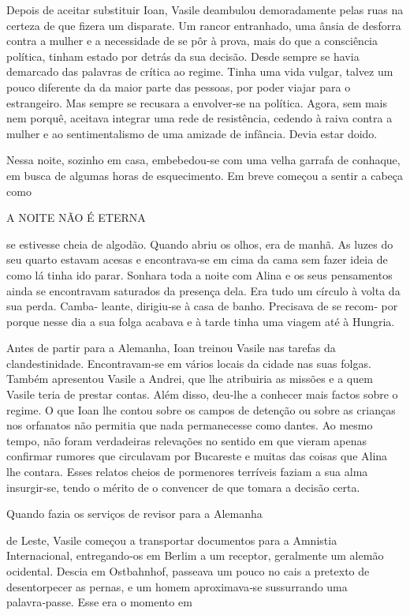 Depois de aceitar substituir Ioan, Vasile deambulou demoradamente pelas
ruas na certeza de que fizera um disparate. Um rancor entranhado, uma
ânsia de desforra contra a mulher e a necessidade de se pôr à prova,
mais do que a consciência política, tinham estado por detrás da sua
decisão. Desde sempre se havia demarcado das palavras de crítica ao
regime. Tinha uma vida vulgar, talvez um pouco diferente da da maior
parte das pessoas, por poder viajar para o estrangeiro. Mas sempre se
recusara a envolver‑se na política. Agora, sem mais nem porquê, aceitava
integrar uma rede de resistência, cedendo à raiva contra a mulher e ao
sentimentalismo de uma amizade de infância. Devia estar doido.

Nessa noite, sozinho em casa, embebedou‑se com uma velha garrafa de
conhaque, em busca de algumas horas de esquecimento. Em breve começou a
sentir a cabeça como

A NOITE NÃO É ETERNA

se estivesse cheia de algodão. Quando abriu os olhos, era de manhã. As
luzes do seu quarto estavam acesas e encontrava‑se em cima da cama sem
fazer ideia de como lá tinha ido parar. Sonhara toda a noite com Alina e
os seus pensamentos ainda se encontravam saturados da presença dela. Era
tudo um círculo à volta da sua perda. Camba‑ leante, dirigiu‑se à casa
de banho. Precisava de se recom‑ por porque nesse dia a sua folga
acabava e à tarde tinha uma viagem até à Hungria.

Antes de partir para a Alemanha, Ioan treinou Vasile nas tarefas da
clandestinidade. Encontravam‑se em vários locais da cidade nas suas
folgas. Também apresentou Vasile a Andrei, que lhe atribuiria as missões
e a quem Vasile teria de prestar contas. Além disso, deu‑lhe a conhecer
mais factos sobre o regime. O que Ioan lhe contou sobre os campos de
detenção ou sobre as crianças nos orfanatos não permitia que nada
permanecesse como dantes. Ao mesmo tempo, não foram verdadeiras
relevações no sentido em que vieram apenas confirmar rumores que
circulavam por Bucareste e muitas das coisas que Alina lhe contara.
Esses relatos cheios de pormenores terríveis faziam a sua alma
insurgir‑se, tendo o mérito de o convencer de que tomara a decisão
certa.

Quando fazia os serviços de revisor para a Alemanha

de Leste, Vasile começou a transportar documentos para a Amnistia
Internacional, entregando‑os em Berlim a um receptor, geralmente um
alemão ocidental. Descia em Ostbahnhof, passeava um pouco no cais a
pretexto de desentorpecer as pernas, e um homem aproximava‑se
sussurrando uma palavra‑passe. Esse era o momento em

